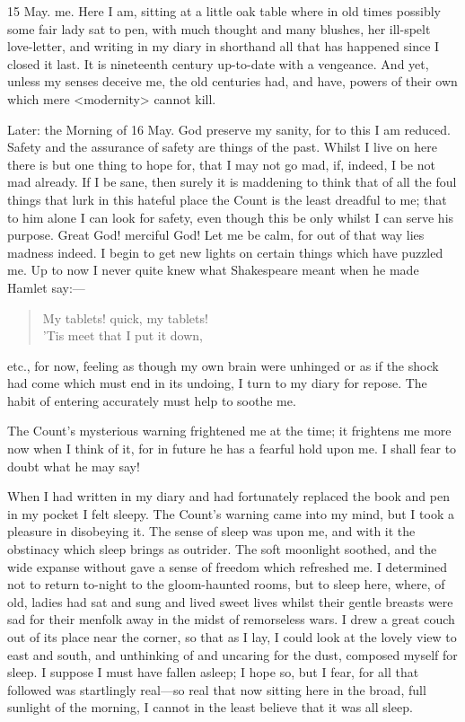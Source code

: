 \begin{diary}{15 May.}
me. Here I am, sitting at a little oak table where in old times possibly some fair lady sat to pen, with much thought and many blushes, her ill-spelt love-letter, and writing in my diary in shorthand all that has happened since I closed it last. It is nineteenth century up-to-date with a vengeance. And yet, unless my senses deceive me, the old centuries had, and have, powers of their own which mere <modernity> cannot kill.
\end{diary}
 
\begin{diary}{Later: the Morning of 16 May.}
God preserve my sanity, for to this I am reduced. Safety and the assurance of safety are things of the past. Whilst I live on here there is but one thing to hope for, that I may not go mad, if, indeed, I be not mad already. If I be sane, then surely it is maddening to think that of all the foul things that lurk in this hateful place the Count is the least dreadful to me; that to him alone I can look for safety, even though this be only whilst I can serve his purpose. Great God! merciful God! Let me be calm, for out of that way lies madness indeed. I begin to get new lights on certain things which have puzzled me. Up to now I never quite knew what Shakespeare meant when he made Hamlet say:—

\begin{quote}My tablets! quick, my tablets!\\
'Tis meet that I put it down,
\end{quote} etc., for now, feeling as though my own brain were unhinged or as if the shock had come which must end in its undoing, I turn to my diary for repose. The habit of entering accurately must help to soothe me.

The Count's mysterious warning frightened me at the time; it frightens me more now when I think of it, for in future he has a fearful hold upon me. I shall fear to doubt what he may say!

When I had written in my diary and had fortunately replaced the book and pen in my pocket I felt sleepy. The Count's warning came into my mind, but I took a pleasure in disobeying it. The sense of sleep was upon me, and with it the obstinacy which sleep brings as outrider. The soft moonlight soothed, and the wide expanse without gave a sense of freedom which refreshed me. I determined not to return to-night to the gloom-haunted rooms, but to sleep here, where, of old, ladies had sat and sung and lived sweet lives whilst their gentle breasts were sad for their menfolk away in the midst of remorseless wars. I drew a great couch out of its place near the corner, so that as I lay, I could look at the lovely view to east and south, and unthinking of and uncaring for the dust, composed myself for sleep. I suppose I must have fallen asleep; I hope so, but I fear, for all that followed was startlingly real—so real that now sitting here in the broad, full sunlight of the morning, I cannot in the least believe that it was all sleep.


\end{diary}
